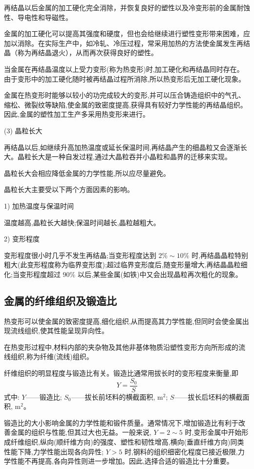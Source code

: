 \documentclass[UTF8]{ctexbook}
\newcommand{\◎}{\ensuremath{\bigcirc}}
\begin{document}
再结晶以后金属的加工硬化完全消除，并恢复良好的塑性以及冷变形前的金属耐蚀性、导电性和导磁性。

金属的加工硬化可以提高其强度和硬度，但也会给继续进行塑性变形带来困难，应加以消除。在实际生产中，如冷轧、冷压过程，常采用加热的方法使金属发生再结晶（称为再结晶退火），从而再次获得良好的塑性。

当金属在再结晶温度以上受力变形(称为热变形)时,加工硬化和再结晶同时存在。由于变形中的加工硬化随时被再结晶过程所消除,所以热变形后无加工硬化现象。

金属在热变形时能够以较小的功完成较大的变形,并可以压合铸造组织中的气孔、缩松、微裂纹等缺陷,使金属的致密度提高,获得具有较好力学性能的再结晶组织。因此,金属的塑性加工生产多采用热变形来进行。

(3) 晶粒长大

再结晶以后,如继续升高加热温度或延长保温时间,再结晶产生的细晶粒又会逐渐长大。晶粒长大是一种自发过程,通过大晶粒吞并小晶粒和晶界的迁移来实现。

晶粒长大会相应降低金属的力学性能,所以应尽量避免。

晶粒长大主要受以下两个方面因素的影响。

1) 加热温度与保温时间

温度越高,晶粒长大越快;保温时间越长,晶粒越粗大。

2) 变形程度

变形程度很小时几乎不发生再结晶;当变形程度达到 $2\% \sim 10\%$ 时,再结晶晶粒特别粗大(此变形程度称为临界变形度);超过临界变形度后,随变形量增大,再结晶晶粒细化;当变形程度超过 $90\%$ 以后,某些金属(如铁)中又会出现晶粒再次粗化的现象。

\subsection{金属的纤维组织及锻造比}

热变形可以使金属的致密度提高,细化组织,从而提高其力学性能,但同时会使金属出现流线组织,使其性能呈现异向性。

在热变形过程中,材料内部的夹杂物及其他非基体物质沿塑性变形方向所形成的流线组织,称为纤维(流线)组织。

纤维组织的明显程度与锻造比有关。锻造比通常用拔长时的变形程度来衡量,即
\[
Y = \frac{S_0}{S}
\]
式中: $Y$——锻造比; $S_0$——拔长前坯料的横截面积, $\mathrm{m}^2$; $S$——拔长后坯料的横截面积, $\mathrm{m}^2$。

锻造比的大小影响金属的力学性能和锻件质量。通常情况下,增加锻造比有利于改善金属的组织与性能,但其过大也无益。一般来说, $Y=2 \sim 5$ 时,变形金属中开始形成纤维组织,纵向(顺纤维方向)的强度、塑性和韧性增高,横向(垂直纤维方向)同类性能下降,力学性能出现各向异性; $Y>5$ 时,钢料的组织细密化程度已接近极限,力学性能不再提高,各向异性则进一步增加。因此,选择合适的锻造比十分重要。
\end{document}
